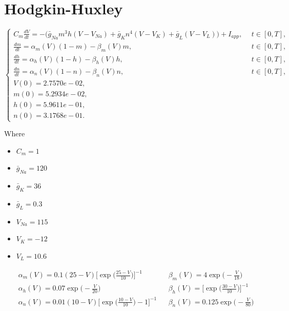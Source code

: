\documentclass{article}
\begin{document}
\section{Hodgkin-Huxley}
\begin{center}
    $\begin{cases}
            C_m\frac{dV}{dt} = -\Big(\bar{g}_{Na}m^3h(V-V_{Na}) +\bar{g}_Kn^4(V-V_K)+\bar{g}_L(V-V_L)\Big) +I_{app}, \ \  & t\in[0,T], \\[15pt]

            \frac{dm}{dt} = \alpha_m(V)(1-m)-\beta_m(V)m, \ \                                                             & t\in[0,T], \\[15pt]
            \frac{dh}{dt} = \alpha_h(V)(1-h)-\beta_h(V)h, \ \                                                             & t\in[0,T], \\[15pt]
            \frac{dn}{dt} = \alpha_n(V)(1-n)-\beta_n(V)n, \ \                                                             & t\in[0,T], \\[15pt]

            V(0) = 2.7570e-02,                                                                                                         \\[15pt]
            m(0) = 5.2934e-02,                                                                                                         \\[15pt]
            h(0) = 5.9611e-01,                                                                                                         \\[15pt]
            n(0) = 3.1768e-01.
        \end{cases}$
\end{center}
Where
\begin{multicols}{2}
    \begin{itemize}
        \item $C_m =1$
        \item $\bar{g}_{Na}=120$
        \item $\bar{g}_K =36$
        \item $\bar{g}_L =0.3$
        \item $V_{Na}=115$
        \item $V_K=-12$
        \item $V_L=10.6$
    \end{itemize}
\end{multicols}
\begin{align*}
     & \alpha_m(V)=0.1(25-V)\Big[\exp\Big(\frac{25-V}{10}\Big)\Big]^{-1}    &  & \beta_m(V)=4\exp\Big(-\frac{V}{18}\Big)                 \\
     & \alpha_h(V)=0.07\exp\Big(-\frac{V}{20}\Big)                          &  & \beta_h(V)=\Big[\exp\Big(\frac{30-V}{10}\Big)\Big]^{-1} \\
     & \alpha_n(V)=0.01(10-V)\Big[\exp\Big(\frac{10-V}{10}\Big)-1\Big]^{-1} &  & \beta_n(V)=0.125\exp\Big(-\frac{V}{80}\Big)             \\
\end{align*}
\end{document}
